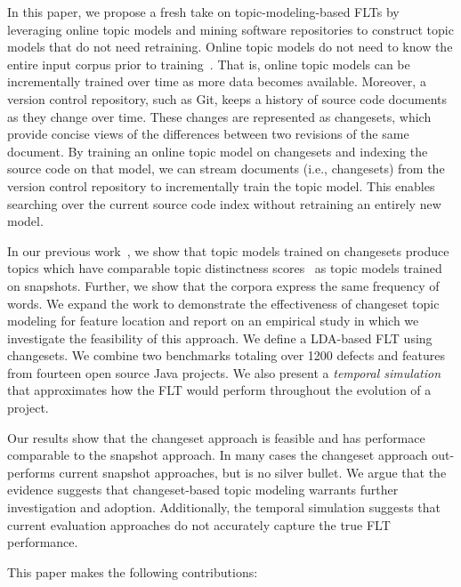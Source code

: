 In this paper, we propose a fresh take on topic-modeling-based FLTs by
leveraging online topic models and mining software repositories to construct
topic models that do not need retraining.  Online topic models do not need to
know the entire input corpus prior to
training~\cite{Hoffman-etal:2010,Radim:2011}.  That is, online topic models can
be incrementally trained over time as more data becomes available.
Moreover, a version control repository, such as Git, keeps a history of source
code documents as they change over time.  These changes are represented as
changesets, which provide concise views of the differences between two revisions
of the same document.  By training an online topic model on changesets and
indexing the source code on that model, we can stream documents (i.e.,
changesets) from the version control repository to incrementally train the topic
model.  This enables searching over the current source code index without
retraining an entirely new model.

In our previous work~\cite{Corley-etal:2014}, we show that topic models trained
on changesets produce topics which have comparable topic distinctness
scores~\cite{Thomas-etal:2011} as topic models trained on snapshots.  Further,
we show that the corpora express the same frequency of words.  We expand the
work to demonstrate the effectiveness of changeset topic modeling for feature
location and report on an empirical study in which we investigate the
feasibility of this approach.
We define a LDA-based FLT using changesets.  We combine two benchmarks totaling
over 1200 defects and features from fourteen open source Java projects.  We also
present a \emph{temporal simulation} that approximates how the FLT would perform
throughout the evolution of a project.

Our results show that the changeset approach is feasible and has performace
comparable to the snapshot approach.  In many cases the changeset approach
out-performs current snapshot approaches, but is no silver bullet.  We argue
that the evidence suggests that changeset-based topic modeling warrants further
investigation and adoption.  Additionally, the temporal simulation suggests that
current evaluation approaches do not accurately capture the true FLT
performance.

This paper makes the following contributions:

